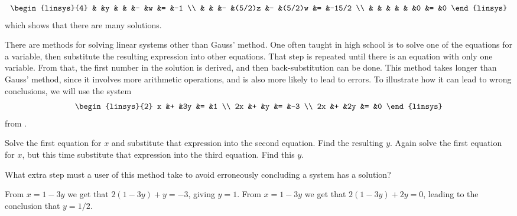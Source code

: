 \begin{exercises}
\begin{answer}
\begin{exparts}
\begin{equation*}
\begin{linsys}{4}
                   &   &y  &   &        &-  &w       &=  &-1 \\
                   &   &   &-  &(5/2)z  &-  &(5/2)w  &=  &-15/2  \\
                   &   &   &   &        &   &0       &=  &0 
             \end{linsys}
         \end{equation*}
         which shows that there are many solutions.
      \end{exparts} 
    \end{answer}
  \recommended \item 
    There are methods for solving linear systems other 
    than Gauss' method.
    One often taught in high school is to solve one of the 
    equations for a variable, then substitute the resulting expression into
    other equations.
    That step is repeated until there is an equation with only one
    variable.
    From that, the first number in the solution is derived, and then 
    back-substitution can be done.
    This method takes longer than Gauss' method, since it involves
    more arithmetic operations, and is also more
    likely to lead to errors.
    To illustrate how it can lead to wrong conclusions, we will use the system 
    \begin{equation*}
      \begin{linsys}{2}
            x  &+  &3y  &=  &1  \\
            2x  &+  &y   &=  &-3 \\
            2x  &+  &2y  &=  &0  
      \end{linsys}
    \end{equation*}
    from .
    \begin{exparts}
      \partsitem Solve the first equation for $x$ and 
        substitute that expression into the second equation.
        Find the resulting $y$.
      \partsitem Again solve the first equation for $x$, 
        but this time substitute that expression into the third equation.
        Find this $y$.
    \end{exparts}
    What extra step must a user of this method take to avoid 
    erroneously concluding a system has a solution?
    \begin{answer}
      \begin{exparts}
        \partsitem From $x=1-3y$ we get that $2(1-3y)+y=-3$, giving $y=1$.
        \partsitem From $x=1-3y$ we get that $2(1-3y)+2y=0$, leading to 
           the conclusion that $y=1/2$.

\end{exparts}
\end{answer}
\end{exercises}
